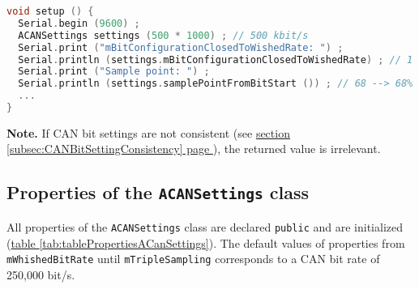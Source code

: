 \documentclass[10pt, a4paper, obeyspaces, openany]{extarticle}
\newcommand \subsectionLabel[2]{\subsection{#1}\label{subsec:#2}}
\newcommand\refSubsectionPage[1]{\hyperref[subsec:#1]{section \ref*{subsec:#1} page \pageref{subsec:#1}}}
\newcommand\refTableau[1]{\hyperref[tab:#1]{table \ref*{tab:#1}}}
\begin{document}
{ \small\begin{lstlisting}[language=c++]
void setup () {
  Serial.begin (9600) ;
  ACANSettings settings (500 * 1000) ; // 500 kbit/s
  Serial.print ("mBitConfigurationClosedToWishedRate: ") ;
  Serial.println (settings.mBitConfigurationClosedToWishedRate) ; // 1 (--> is true)
  Serial.print ("Sample point: ") ;
  Serial.println (settings.samplePointFromBitStart ()) ; // 68 --> 68%
  ...
}
\end{lstlisting}}

{\bf Note. } If CAN bit settings are not consistent (see \refSubsectionPage{CANBitSettingConsistency}), the returned value is irrelevant.






\subsectionLabel{Properties of the \texttt{ACANSettings} class}{propertiesACanSettings}

All properties of the \texttt{ACANSettings} class are declared \texttt{public} and are initialized (\refTableau{tablePropertiesACanSettings}). The default values of properties from \texttt{mWhishedBitRate} until \texttt{mTripleSampling} corresponds to a CAN bit rate of 250,000 bit/s.
\end{document}
